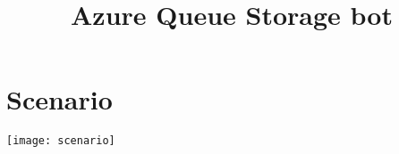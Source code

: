 \documentclass[slides]{pgnotes}
\title{Azure Queue Storage bot}
\begin{document}
\maketitle

\tableofcontents

\section{Scenario}

\texttt{[image: scenario]}
\end{document}
